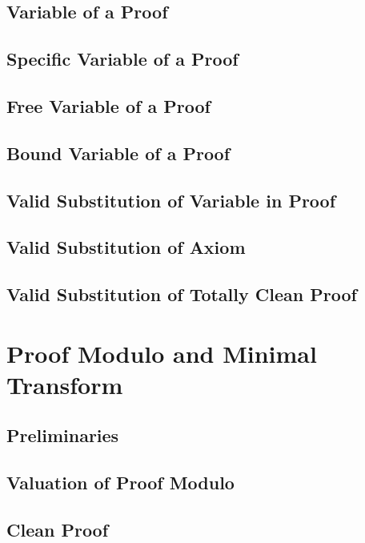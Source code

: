 \documentclass{report}
\begin{document}
    \subsection{Variable of a Proof}
      
    \subsection{Specific Variable of a Proof}
      
    \subsection{Free Variable of a Proof}
      
    \subsection{Bound Variable of a Proof}
      
    \subsection{Valid Substitution of Variable in Proof}
      
    \subsection{Valid Substitution of Axiom}
      
    \subsection{Valid Substitution of Totally Clean Proof}
      
\section{Proof Modulo and Minimal Transform}
    \subsection{Preliminaries}
      
    \subsection{Valuation of Proof Modulo}
      
    \subsection{Clean Proof}
      
\end{document}
